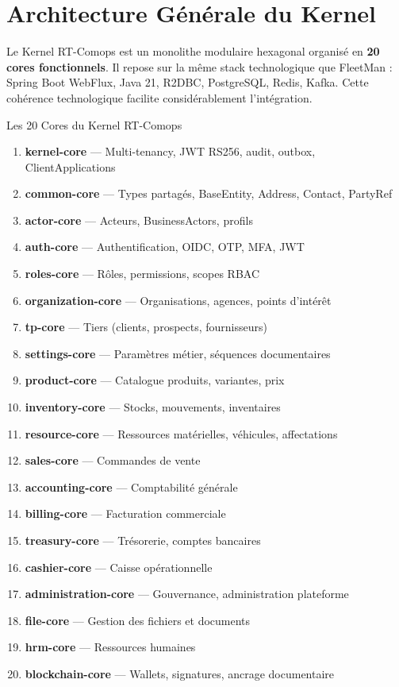 \documentclass[12pt,a4paper]{report}
\begin{document}
\section*{Architecture Générale du Kernel}

Le Kernel RT-Comops est un monolithe modulaire hexagonal organisé en \textbf{20 cores fonctionnels}. Il repose sur la même stack technologique que FleetMan : Spring Boot WebFlux, Java 21, R2DBC, PostgreSQL, Redis, Kafka. Cette cohérence technologique facilite considérablement l'intégration.

\begin{kernelbox}{Les 20 Cores du Kernel RT-Comops}
\begin{enumerate}[leftmargin=1.5cm, itemsep=2pt]
  \item \textbf{kernel-core} — Multi-tenancy, JWT RS256, audit, outbox, ClientApplications
  \item \textbf{common-core} — Types partagés, BaseEntity, Address, Contact, PartyRef
  \item \textbf{actor-core} — Acteurs, BusinessActors, profils
  \item \textbf{auth-core} — Authentification, OIDC, OTP, MFA, JWT
  \item \textbf{roles-core} — Rôles, permissions, scopes RBAC
  \item \textbf{organization-core} — Organisations, agences, points d'intérêt
  \item \textbf{tp-core} — Tiers (clients, prospects, fournisseurs)
  \item \textbf{settings-core} — Paramètres métier, séquences documentaires
  \item \textbf{product-core} — Catalogue produits, variantes, prix
  \item \textbf{inventory-core} — Stocks, mouvements, inventaires
  \item \textbf{resource-core} — Ressources matérielles, véhicules, affectations
  \item \textbf{sales-core} — Commandes de vente
  \item \textbf{accounting-core} — Comptabilité générale
  \item \textbf{billing-core} — Facturation commerciale
  \item \textbf{treasury-core} — Trésorerie, comptes bancaires
  \item \textbf{cashier-core} — Caisse opérationnelle
  \item \textbf{administration-core} — Gouvernance, administration plateforme
  \item \textbf{file-core} — Gestion des fichiers et documents
  \item \textbf{hrm-core} — Ressources humaines
  \item \textbf{blockchain-core} — Wallets, signatures, ancrage documentaire
\end{enumerate}
\end{kernelbox}
\end{document}
